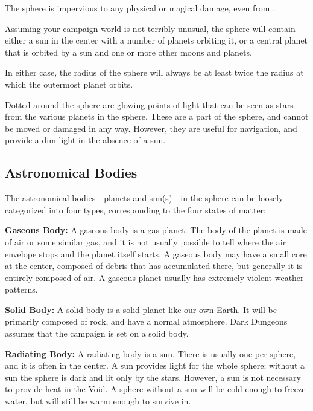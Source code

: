 \begin{multicols*}{2}
The sphere is impervious to any physical or magical damage, even from .

Assuming your campaign world is not terribly unusual, the sphere will contain either a sun in the center with a number of planets orbiting it, or a central planet that is orbited by a sun and one or more other moons and planets.

In either case, the radius of the sphere will always be at least twice the radius at which the outermost planet orbits.


Dotted around the sphere are glowing points of light that can be seen as stars from the various planets in the sphere. These are a part of the sphere, and cannot be moved or damaged in any way. However, they are useful for navigation, and provide a dim light in the absence of a sun.

\subsection{Astronomical Bodies}
The astronomical bodies—planets and sun(s)—in the sphere can be loosely categorized into four types, corresponding to the four states of matter:

\textbf{Gaseous Body:} A gaseous body is a gas planet. The body of the planet is made of air or some similar gas, and it is not usually possible to tell where the air envelope stops and the planet itself starts. A gaseous body may have a small core at the center, composed of debris that has accumulated there, but generally it is entirely composed of air. A gaseous planet usually has extremely violent weather patterns.

\textbf{Solid Body:} A solid body is a solid planet like our own Earth. It will be primarily composed of rock, and have a normal atmosphere. Dark Dungeons assumes that the campaign is set on a solid body.

\textbf{Radiating Body:} A radiating body is a sun. There is usually one per sphere, and it is often in the center. A sun provides light for the whole sphere; without a sun the sphere is dark and lit only by the stars. However, a sun is not necessary to provide heat in the Void. A sphere without a sun will be cold enough to freeze water, but will still be warm enough to survive in.


\end{multicols*}
